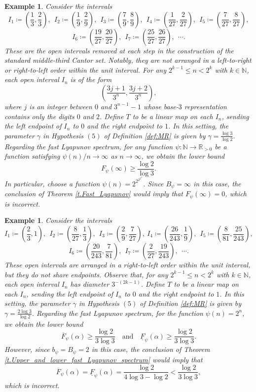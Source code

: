 \documentclass[12pt,reqno]{amsart}
\renewcommand{\=}{\coloneqq}
\theoremstyle{plain}
\newtheorem{example}[theorem]{Example}
\begin{document}
\begin{example}
Consider the intervals
\[
I_1 \coloneqq \left(\frac{1}{3}, \frac{2}{3}\right),\ \ I_2 \coloneqq \left(\frac{1}{9}, \frac{2}{9}\right),\ \ I_3 \coloneqq \left(\frac{7}{9}, \frac{8}{9}\right),\ \ I_4 \coloneqq \left(\frac{1}{27}, \frac{2}{27}\right),\ \ I_5 \coloneqq \left(\frac{7}{27}, \frac{8}{27}\right),
\]
\[
I_6 \coloneqq \left(\frac{19}{27}, \frac{20}{27}\right),\ \ I_7 \coloneqq \left(\frac{25}{27}, \frac{26}{27}\right),\ \ \cdots.
\]
These are the open intervals removed at each step in the construction of the standard middle-third Cantor set. Notably, they are not arranged in a left-to-right or right-to-left order within the unit interval. For any $2^{k-1} \leq n <2^k$ with $k \in \mathbb N$, each open interval $I_n$ is of the form
\[
\left(\frac{3j+1}{3^n}, \frac{3j+2}{3^n}\right),
\]
where $j$ is an integer between $0$ and $3^{n-1}-1$ whose base-$3$ representation contains only the digits $0$ and $2$. Define $T$ to be a linear map on each $I_n$, sending the left endpoint of $I_n$ to $0$ and the right endpoint to $1$. In this setting, the parameter $\gamma$ in Hypothesis $(5)$ of Definition \ref{def:MR} is given by $\gamma = \frac{\log 3}{\log 2}$. Regarding the fast Lyapunov spectrum, for any function $\psi:\mathbb{N}\to\mathbb{R}_{>0}$ be a function satisfying $\psi(n)/n \to \infty$ as $n\to \infty$, we obtain the lower bound
\[
F_{\psi}(\infty) \geq \frac{\log 2}{\log 3}.
\]
In particular, choose a function $\psi(n)=2^{2^{2^{2^n}}}$. Since $B_\psi = \infty$ in this case, the conclusion of Theorem \ref{t.Fast_Lyapunov} would imply that $F_{\psi}(\infty)=0$, which is incorrect.
\end{example}
\begin{example}
Consider the intervals
\[
I_1 \coloneqq \left(\frac{2}{3}, 1\right),\ \ I_2 \coloneqq \left(\frac{8}{27}, \frac{1}{3}\right),\ \ I_3 \coloneqq \left(\frac{2}{9}, \frac{7}{27}\right), \ I_4 \coloneqq \left(\frac{26}{243}, \frac{1}{9}\right),\ \ I_5 \coloneqq \left(\frac{8}{81},\frac{25}{243}\right),
\]
\[
I_6 \coloneqq \left(\frac{20}{243}, \frac{7}{81}\right),\ \ I_7 \coloneqq \left(\frac{2}{27}, \frac{19}{243}\right),\ \ \cdots.
\]
These open intervals are arranged in a right-to-left order within the unit interval, but they do not share endpoints. Observe that, for any $2^{k-1} \leq n <2^k$ with $k \in \mathbb N$, each open interval $I_n$ has diameter $3^{-(2k-1)}$. Define $T$ to be a linear map on each $I_n$, sending the left endpoint of $I_n$ to $0$ and the right endpoint to $1$. In this setting, the parameter $\gamma$ in Hypothesis $(5)$ of Definition \ref{def:MR} is given by $\gamma = \frac{2\log 3}{\log 2}$. Regarding the fast Lyapunov spectrum, for the function $\psi(n)=2^n$, we obtain the lower bound
\[
\overline{F}_{\psi}(\alpha) \geq \frac{\log 2}{3\log 3}
\quad \text{and} \quad
\underline{F}_{\psi}(\alpha)\geq \frac{\log 2}{3\log 3}.
\]
However, since $b_\psi = B_\psi = 2$ in this case, the conclusion of Theorem \ref{t.Upper_and_lower_fast_Lyapunov_spectrum} would imply that
\[
\overline{F}_{\psi}(\alpha)=
\underline{F}_{\psi}(\alpha) = \frac{\log 2}{4\log 3-\log 2} < \frac{\log 2}{3\log 3},
\]
which is incorrect.
\end{example}
\end{document}
